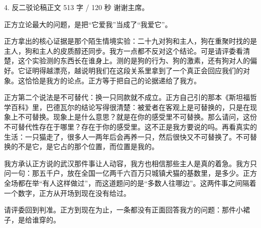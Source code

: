 \documentclass[script,con]{debate}
\begin{document}
\begin{speech}{4. 反二驳论稿}{正文 513 字 / 120 秒}
谢谢主席。

正方立论最大的问题，是把“它爱我”当成了“我爱它”。

正方拿出的核心证据是那个陌生情境实验：二十九对狗和主人，狗在重聚时找的是主人，狗和主人的皮质醇还同步。我方一点都不反对这个结论。可是请评委看清楚，这个实验测的东西长在谁身上。测的是狗的行为、狗的激素，还有狗对人的偏好。它证明得越漂亮，越说明我们在这段关系里拿到了一个真正会回应我们的对象。这恰恰是我方的论点。正方等于把自己的论据递给了我方。

正方第二个说法是不可替代：换一只同款就不成立。正方自己引的那本《斯坦福哲学百科》里，巴德瓦尔的结论写得很清楚：被爱者在客观上是可替换的，只是在现象上不可替换。现象上是什么意思？就是在你的感受里不可替换。那么请问，这份不可替代性存在于哪里？存在于你的感受里。这不正是我方要说的吗。再看真实的生活：一只猫走了，很多人一两年后会再养一只，然后很快又不可替换了。不可替换的不是它，是它占的那个位置，而位置是我的。

我方承认正方说的武汉那件事让人动容，我方也相信那些主人是真的着急。我方只问一句：那五千户，放在全国一亿两千六百万只城镇犬猫的基数里，是多少。正方全场都在举“有人这样做过”，而这道题问的是“多数人往哪边”。这两件事之间隔着一个数字，正方从开场到现在没有给过。

请评委回到判准。正方到现在为止，一条都没有正面回答我方的问题：那件小裙子，是给谁穿的。

\begin{contingency}
\end{contingency}
\end{speech}
\end{document}
